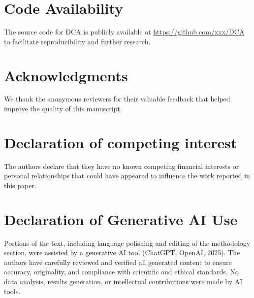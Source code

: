 \documentclass[final,3p,times,review,sort&compress]{elsarticle}
\begin{document}
\section*{Code Availability}
The source code for DCA is publicly available at \url{https://github.com/xxx/DCA} to facilitate reproducibility and further research.


\section*{Acknowledgments}
We thank the anonymous reviewers for their valuable feedback that helped improve the quality of this manuscript.

\section*{Declaration of competing interest}
The authors declare that they have no known competing financial interests or personal relationships that could have appeared to influence the work reported in this paper.

\section*{Declaration of Generative AI Use}
Portions of the text, including language polishing and editing of the methodology section, were assisted by a generative AI tool (ChatGPT, OpenAI, 2025). The authors have carefully reviewed and verified all generated content to ensure accuracy, originality, and compliance with scientific and ethical standards. No data analysis, results generation, or intellectual contributions were made by AI tools.




\end{document}
